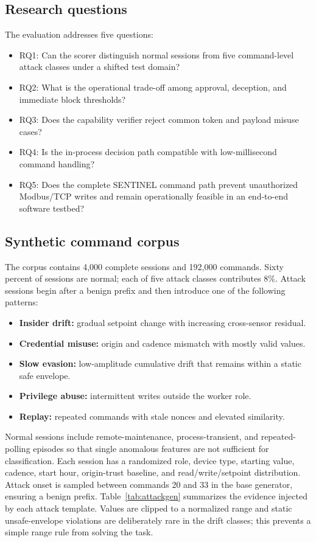 \documentclass[journal]{IEEEtran}
\begin{document}
\subsection{Research questions}
The evaluation addresses five questions:
\begin{itemize}
    \item RQ1: Can the scorer distinguish normal sessions from five command-level attack classes under a shifted test domain?
    \item RQ2: What is the operational trade-off among approval, deception, and immediate block thresholds?
    \item RQ3: Does the capability verifier reject common token and payload misuse cases?
    \item RQ4: Is the in-process decision path compatible with low-millisecond command handling?
    \item RQ5: Does the complete SENTINEL command path prevent unauthorized Modbus/TCP writes and remain operationally feasible in an end-to-end software testbed?
\end{itemize}

\subsection{Synthetic command corpus}
The corpus contains 4,000 complete sessions and 192,000 commands. Sixty percent of sessions are normal; each of five attack classes contributes 8\%. Attack sessions begin after a benign prefix and then introduce one of the following patterns:
\begin{itemize}
    \item \textbf{Insider drift:} gradual setpoint change with increasing cross-sensor residual.
    \item \textbf{Credential misuse:} origin and cadence mismatch with mostly valid values.
    \item \textbf{Slow evasion:} low-amplitude cumulative drift that remains within a static safe envelope.
    \item \textbf{Privilege abuse:} intermittent writes outside the worker role.
    \item \textbf{Replay:} repeated commands with stale nonces and elevated similarity.
\end{itemize}
Normal sessions include remote-maintenance, process-transient, and repeated-polling episodes so that single anomalous features are not sufficient for classification. Each session has a randomized role, device type, starting value, cadence, start hour, origin-trust baseline, and read/write/setpoint distribution. Attack onset is sampled between commands 20 and 33 in the base generator, ensuring a benign prefix. Table~\ref{tab:attackgen} summarizes the evidence injected by each attack template. Values are clipped to a normalized range and static unsafe-envelope violations are deliberately rare in the drift classes; this prevents a simple range rule from solving the task.
\end{document}
